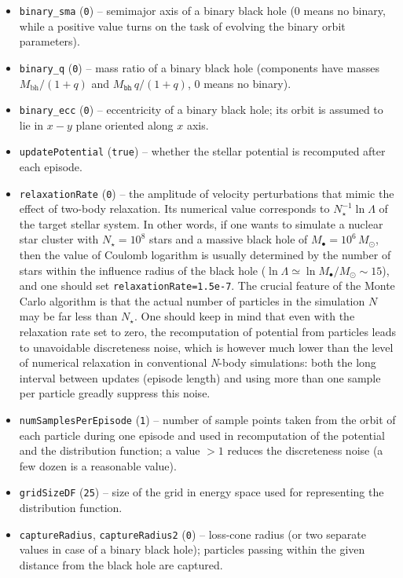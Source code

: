 \documentclass[12pt]{article}
\newcommand{\Nbody}{\textsl{N}-body\xspace}
\begin{document}
\begin{itemize}
\item \texttt{binary_sma}  (\texttt{0}) -- semimajor axis of a binary black hole (0 means no binary, while a positive value turns on the task of evolving the binary orbit parameters).
\item \texttt{binary_q}  (\texttt{0}) -- mass ratio of a binary black hole (components have masses $M_\mathrm{bh}/(1+q)$ and $M_\texttt{bh}\,q/(1+q)$, 0 means no binary).
\item \texttt{binary_ecc}  (\texttt{0}) -- eccentricity of a binary black hole; its orbit is assumed to lie in $x-y$ plane oriented along $x$ axis.
\item \texttt{updatePotential}  (\texttt{true}) -- whether the stellar potential is recomputed after each episode.
\item \texttt{relaxationRate}  (\texttt{0}) -- the amplitude of velocity perturbations that mimic the effect of two-body relaxation. Its numerical value corresponds to $N_\star^{-1}\ln\Lambda$ of the target stellar system. In other words, if one wants to simulate a nuclear star cluster with $N_\star=10^8$ stars and a massive black hole of $M_\bullet=10^6\,M_\odot$, then the value of Coulomb logarithm is usually determined by the number of stars within the influence radius of the black hole ($\ln\Lambda \simeq \ln M_\bullet/M_\odot \sim 15$), and one should set \texttt{relaxationRate=1.5e-7}. The crucial feature of the Monte Carlo algorithm is that the actual number of particles in the simulation $N$ may be far less than $N_\star$.
One should keep in mind that even with the relaxation rate set to zero, the recomputation of potential from particles leads to unavoidable discreteness noise, which is however much lower than the level of numerical relaxation in conventional \Nbody simulations: both the long interval between updates (episode length) and using more than one sample per particle greadly suppress this noise.
\item \texttt{numSamplesPerEpisode}  (\texttt{1}) -- number of sample points taken from the orbit of each particle during one episode and used in recomputation of the potential and the distribution function; a value $>1$ reduces the discreteness noise (a few dozen is a reasonable value).
\item \texttt{gridSizeDF}  (\texttt{25}) -- size of the grid in energy space used for representing the distribution function.
\item \texttt{captureRadius}, \texttt{captureRadius2}  (\texttt{0}) -- loss-cone radius (or two separate values in case of a binary black hole); particles passing within the given distance from the black hole are captured.

\end{itemize}
\end{document}
